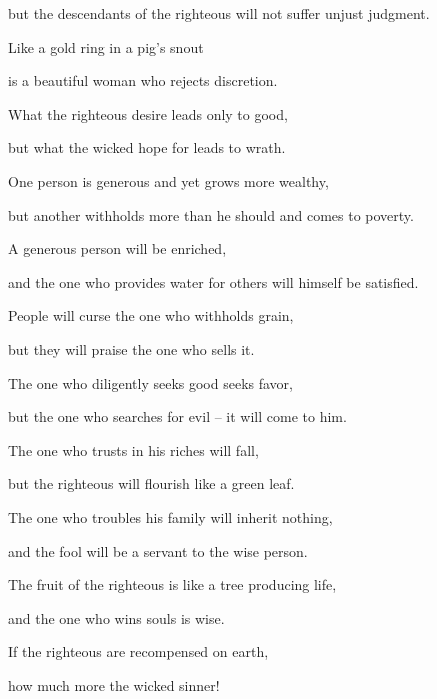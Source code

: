 {\par }{\Q but the descendants
of the righteous
will not
suffer unjust judgment.
\par }{\Q {}Like a gold
ring
in a pig’s
snout
\par }{\Q is a beautiful
woman
who rejects
discretion.
\par }{\Q {}What the righteous
desire
leads only
to good,
\par }{\Q but what the wicked
hope
for leads to wrath.
\par }{\Q {}One person is
generous
and yet grows more
wealthy,
\par }{\Q but
another withholds
more than he should
and comes to poverty.
\par }{\Q {}A generous
person
will be enriched,
\par }{\Q and the one who provides water
for others
will himself be satisfied.
\par }{\Q {}People
will curse
the one who withholds
grain,
\par }{\Q but they will praise
the one
who sells it.
\par }{\Q {}The one who diligently
seeks good
seeks
favor,
\par }{\Q but the one who searches
for evil
– it will come to him.
\par }{\Q {}The one who trusts
in his riches
will fall,
\par }{\Q but the righteous
will flourish
like a green leaf.
\par }{\Q {}The one who troubles
his family
will inherit
nothing,

\par }{\Q and the fool
will be a servant
to the wise
person.
\par }{\Q {}The fruit
of the righteous
is like a tree
producing life,
\par }{\Q and the one who wins
souls
is wise.
\par }{\Q {}If
the righteous
are recompensed
on earth,
\par }{\Q how much
more the wicked
sinner!

}
